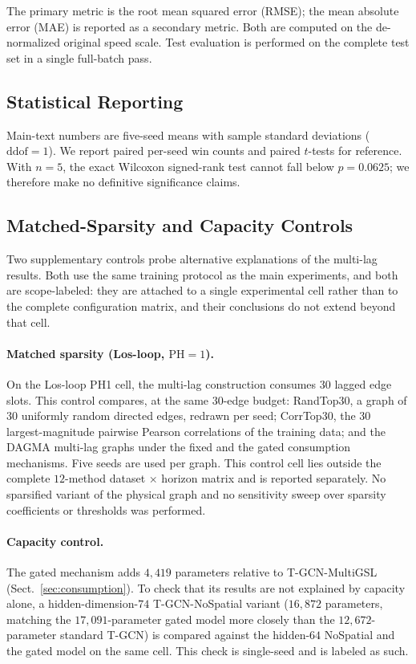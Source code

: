 The primary metric is the root mean squared error (RMSE); the mean absolute
error (MAE) is reported as a secondary metric. Both are computed on the
de-normalized original speed scale. Test evaluation is performed on the
complete test set in a single full-batch pass.

\subsection{Statistical Reporting}\label{sec:stats}

Main-text numbers are five-seed means with sample standard deviations
($\mathrm{ddof}=1$). We report paired per-seed win counts and paired
$t$-tests for reference. With $n=5$, the exact Wilcoxon signed-rank test
cannot fall below $p=0.0625$; we therefore make no definitive significance
claims.

\subsection{Matched-Sparsity and Capacity Controls}\label{sec:controls}

Two supplementary controls probe alternative explanations of the multi-lag
results. Both use the same training protocol as the main experiments, and
both are scope-labeled: they are attached to a single experimental cell
rather than to the complete configuration matrix, and their conclusions do
not extend beyond that cell.

\paragraph{Matched sparsity (Los-loop, $\mathrm{PH}=1$).}
On the Los-loop PH1 cell, the multi-lag construction consumes $30$ lagged
edge slots. This control compares, at the same $30$-edge budget: RandTop30,
a graph of $30$ uniformly random directed edges, redrawn per seed; CorrTop30,
the $30$ largest-magnitude pairwise Pearson correlations of the training
data; and the DAGMA multi-lag graphs under the fixed and the gated
consumption mechanisms. Five seeds are used per graph. This control cell
lies outside the complete $12$-method dataset $\times$ horizon matrix and is
reported separately. No sparsified variant of the physical graph and no
sensitivity sweep over sparsity coefficients or thresholds was performed.

\paragraph{Capacity control.}
The gated mechanism adds $4{,}419$ parameters relative to T-GCN-MultiGSL
(Sect.~\ref{sec:consumption}). To check that its results are not explained by
capacity alone, a hidden-dimension-$74$ T-GCN-NoSpatial variant
($16{,}872$ parameters, matching the $17{,}091$-parameter gated model more
closely than the $12{,}672$-parameter standard T-GCN) is compared against
the hidden-$64$ NoSpatial and the gated model on the same cell. This check
is single-seed and is labeled as such.

